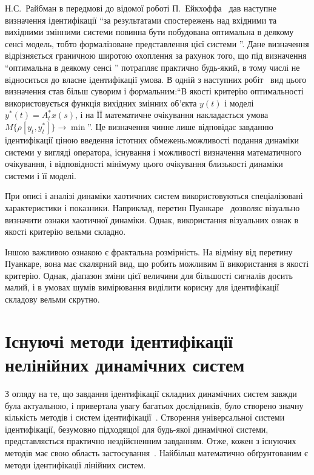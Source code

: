Н.С.~Райбман в передмові до відомої роботі
П.~Ейкхоффа~\cite{eykhoff_id_base} дав наступне визначення ідентифікації
``за результатами спостережень над вхідними та вихідними
змінними системи повинна бути побудована оптимальна в
деякому сенсі модель, тобто формалізоване представлення цієї
системи ''. Дане визначення відрізняється граничною широтою
охоплення за рахунок того, що під визначення ``оптимальна в
деякому сенсі '' потрапляє практично будь-який, в тому числі не
відноситься до власне ідентифікації умова. В одній з наступних
робіт~\cite{raibman_id_obj_ctl} вид цього визначення став більш суворим і
формальним:``В якості критерію оптимальності використовується
функція вихідних змінних об'єкта
$ y (t) $ і моделі
$ y ^{*} (t) = A_t ^{*} x (s) $, і на ЇЇ математичне очікування накладається
умова
$ M \{\rho [y_t, y_t ^{*}] \} \to{\min} $''. Це визначення чинне лише
відповідає завданню ідентифікації ціною введення істотних
обмежень:можливості подання динаміки системи у вигляді
оператора, існування і можливості визначення математичного
очікування, і відповідності мінімуму цього очікування
близькості динаміки системи і її моделі.







При описі і аналізі динаміки хаотичних систем
використовуються спеціалізовані характеристики і
показники. Наприклад, перетин Пуанкаре~\cite{moon_chaotic_vibr,
anisch_complex_vibrations_in_simple_systems, atu_st105} дозволяє візуально визначити
ознаки хаотичної динаміки. Однак, використання візуальних
ознак в якості критерію вельми складно.

Іншою важливою ознакою є фрактальна розмірність. На відміну від
перетину Пуанкаре, вона має скалярний вид, що робить можливим
її використання в якості критерію. Однак, діапазон зміни цієї
величини для більшості сигналів досить малий, і в умовах шумів
вимірювання виділити корисну для ідентифікації складову
вельми скрутно.


\section{Існуючі методи ідентифікації нелінійних динамічних систем}%

З огляду на те, що завдання ідентифікації складних динамічних
систем завжди була актуальною, і привертала увагу багатьох
дослідників, було створено значну кількість методів і систем
ідентифікації~\cite{eykhoff_id_base, leondes_modern_tu, nelles_nlsys_id}. Створення
універсальної системи ідентифікації, безумовно підходящої
для будь-якої динамічної системи, представляється практично
нездійсненним завданням. Отже, кожен з існуючих методів має
свою область застосування~\cite{rastr_intro}. Найбільш математично
обґрунтованим є методи ідентифікації лінійних систем.

